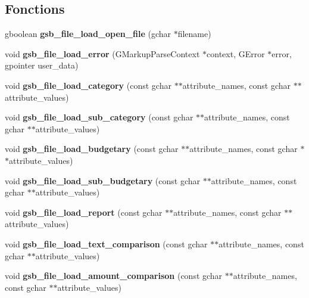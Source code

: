 \subsection*{Fonctions}
\begin{DoxyCompactItemize}
\item 
gboolean {\bf gsb\_\-file\_\-load\_\-open\_\-file} (gchar $\ast$filename)
\item 
void {\bf gsb\_\-file\_\-load\_\-error} (GMarkupParseContext $\ast$context, GError $\ast$error, gpointer user\_\-data)
\item 
void {\bf gsb\_\-file\_\-load\_\-category} (const gchar $\ast$$\ast$attribute\_\-names, const gchar $\ast$$\ast$attribute\_\-values)
\item 
void {\bf gsb\_\-file\_\-load\_\-sub\_\-category} (const gchar $\ast$$\ast$attribute\_\-names, const gchar $\ast$$\ast$attribute\_\-values)
\item 
void {\bf gsb\_\-file\_\-load\_\-budgetary} (const gchar $\ast$$\ast$attribute\_\-names, const gchar $\ast$$\ast$attribute\_\-values)
\item 
void {\bf gsb\_\-file\_\-load\_\-sub\_\-budgetary} (const gchar $\ast$$\ast$attribute\_\-names, const gchar $\ast$$\ast$attribute\_\-values)
\item 
void {\bf gsb\_\-file\_\-load\_\-report} (const gchar $\ast$$\ast$attribute\_\-names, const gchar $\ast$$\ast$attribute\_\-values)
\item 
void {\bf gsb\_\-file\_\-load\_\-text\_\-comparison} (const gchar $\ast$$\ast$attribute\_\-names, const gchar $\ast$$\ast$attribute\_\-values)
\item 
void {\bf gsb\_\-file\_\-load\_\-amount\_\-comparison} (const gchar $\ast$$\ast$attribute\_\-names, const gchar $\ast$$\ast$attribute\_\-values)
\end{DoxyCompactItemize}
